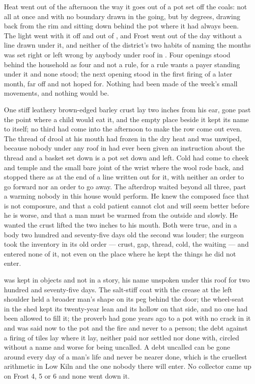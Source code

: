 Heat went out of the afternoon the way it goes out of a pot set off the coals: not all at once and with no boundary drawn in the going, but by degrees, drawing back from the rim and sitting down behind the pot where it had always been. The light went with it off  and out of , and Frost went out of the day without a line drawn under it, and neither of the district's two habits of naming the months was set right or left wrong by anybody under  roof in . Four openings stood behind the household as four and not a rule, for a rule wants a payer standing under it and none stood; the next opening stood in the first firing of a later month, far off and not hoped for. Nothing had been made of the week's small movements, and nothing would be.

One stiff leathery brown-edged barley crust lay two inches from his ear, gone past the point where a child would eat it, and the empty place beside it kept its name to itself; no third had come into the afternoon to make the row come out even. The thread of drool at his mouth had frozen in the dry heat and was unwiped, because nobody under any roof in  had ever been given an instruction about the thread and a basket set down is a pot set down and left. Cold had come to cheek and temple and the small bare joint of the wrist where the wool rode back, and stopped there as at the end of a line written out for it, with neither an order to go forward nor an order to go away. The afterdrop waited beyond all three, past a warming nobody in this house would perform. He knew the composed face that is not composure, and that a cold patient cannot clot and will seem better before he is worse, and that a man must be warmed from the outside and slowly. He wanted the crust lifted the two inches to his mouth. Both were true, and in a body two hundred and seventy-five days old the second was louder; the surgeon took the inventory in its old order --- crust, gap, thread, cold, the waiting --- and entered none of it, not even on the place where he kept the things he did not enter.

 was kept in objects and not in a story, his name unspoken under this roof for two hundred and seventy-five days. The salt-stiff coat with the crease at the left shoulder held a broader man's shape on its peg behind the door; the wheel-seat in the shed kept its twenty-year lean and its hollow on that side, and no one had been allowed to fill it; the proverb had gone years ago to a pot with no crack in it and was said now to the pot and the fire and never to a person; the debt against a firing of tiles lay where it lay, neither paid nor settled nor done with, circled without a name and worse for being uncalled. A debt uncalled can be gone around every day of a man's life and never be nearer done, which is the cruellest arithmetic in Low Kiln and the one nobody there will enter. No collector came up  on Frost 4, 5 or 6 and none went down it.

